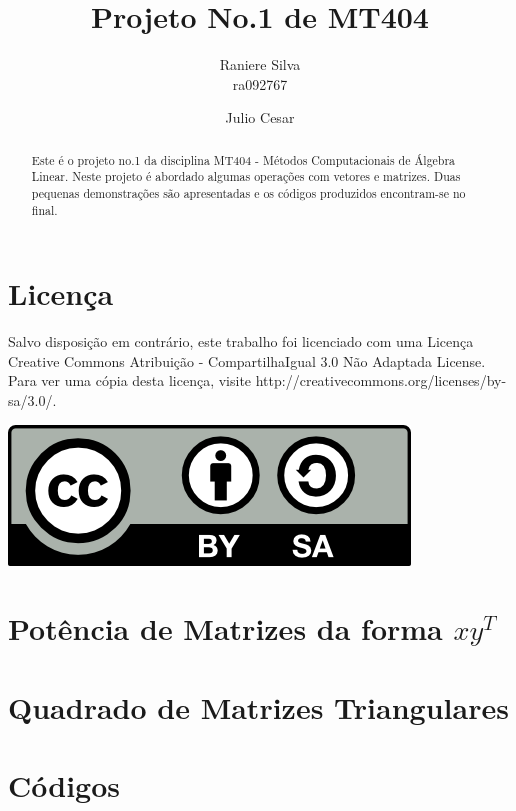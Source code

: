 \documentclass[12pt,a4paper]{article}
\begin{document}
\title{Projeto No.1 de MT404}
\author{Raniere Silva \\ ra092767 \and Julio Cesar}
\maketitle
\begin{abstract}
    Este \'{e} o projeto no.1 da disciplina MT404 - M\'{e}todos Computacionais de \'{A}lgebra Linear. Neste projeto \'{e} abordado algumas opera\c{c}\~{o}es com vetores e matrizes. Duas pequenas demonstra\c{c}\~{o}es s\~{a}o apresentadas e os c\'{o}digos produzidos encontram-se no final.
\end{abstract}
\tableofcontents
\lstlistoflistings
\section*{Licen\c{c}a}
Salvo disposi\c{c}\~{a}o em contr\'{a}rio, este trabalho foi licenciado com uma Licen\c{c}a Creative Commons Atribui\c{c}\~{a}o - CompartilhaIgual 3.0 N\~{a}o Adaptada License. Para ver uma c\'{o}pia desta licen\c{c}a, visite http://creativecommons.org/licenses/by-sa/3.0/.
\begin{center}
    \includegraphics{../figuras/cc-by-sa.png}
\end{center}
\newpage
\section{Pot\^{e}ncia de Matrizes da forma $xy^T$}

\section{Quadrado de Matrizes Triangulares}
\section{C\'{o}digos}




\end{document}
